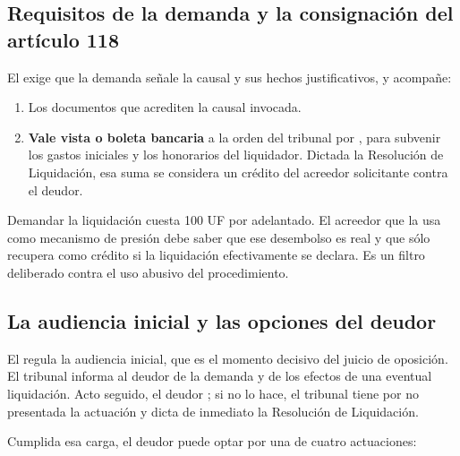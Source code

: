 \subsection{Requisitos de la demanda y la consignación del artículo 118}

El  exige que la demanda señale la causal y sus hechos justificativos, y acompañe:

\begin{enumerate}
  \item Los documentos que acrediten la causal invocada.
  \item \textbf{Vale vista o boleta bancaria} a la orden del tribunal por
  , para subvenir los gastos iniciales y los honorarios
  del liquidador. Dictada la Resolución de Liquidación, esa suma se considera un crédito del
  acreedor solicitante contra el deudor.
\end{enumerate}

\begin{alerta}
Demandar la liquidación cuesta 100 UF por adelantado. El acreedor que la usa como mecanismo
de presión debe saber que ese desembolso es real y que sólo recupera como crédito si la
liquidación efectivamente se declara. Es un filtro deliberado contra el uso abusivo del
procedimiento.
\end{alerta}

\subsection{La audiencia inicial y las opciones del deudor}

El  regula la audiencia inicial, que es el momento decisivo del juicio de
oposición. El tribunal informa al deudor de la demanda y de los efectos de una eventual
liquidación. Acto seguido, el deudor ; si no lo hace, el tribunal tiene por
no presentada la actuación y dicta de inmediato la Resolución de Liquidación.

Cumplida esa carga, el deudor puede optar por una de cuatro actuaciones:

